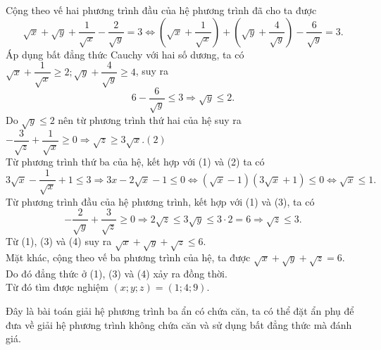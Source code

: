 \begin{bt}
{		 Cộng theo vế hai phương trình đầu của hệ phương trình đã cho ta được
		\[\sqrt{x}+\sqrt{y}+\dfrac{1}{\sqrt{x}}-\dfrac{2}{\sqrt{y}}=3 \Leftrightarrow \left(\sqrt{x}+\dfrac{1}{\sqrt{x}}\right)+\left(\sqrt{y}+\dfrac{4}{\sqrt{y}}\right)-\dfrac{6}{\sqrt{y}}=3.\]
		Áp dụng bất đẳng thức Cauchy với hai số dương, ta có $\sqrt{x}+\dfrac{1}{\sqrt{x}}\ge 2;\sqrt{y}+\dfrac{4}{\sqrt{y}}\ge 4$,  suy ra \[6-\dfrac{6}{\sqrt{y}}\le 3 \Rightarrow \sqrt{y}\le 2.\tag{1}\]
		Do $\sqrt{y}\le 2$ nên từ phương trình thứ hai của hệ suy ra $-\dfrac{3}{\sqrt{z}}+\dfrac{1}{\sqrt{x}}\ge 0\Rightarrow \sqrt{z}\ge 3\sqrt{x}$.\hfill$(2)$\\
		Từ phương trình thứ ba của hệ, kết hợp với (1) và (2) ta có
		\[3\sqrt{x}-\dfrac{1}{\sqrt{x}}+1\le 3\Rightarrow 3x-2\sqrt{x}-1\le 0 \Leftrightarrow \left(\sqrt{x}-1\right)\left(3\sqrt{x}+1\right)\le 0\Leftrightarrow\sqrt{x}\le 1.\tag{3}\]
		Từ phương trình đầu của hệ phương trình, kết hợp với (1) và (3), ta có
		\[-\dfrac{2}{\sqrt{y}}+\dfrac{3}{\sqrt{z}}\ge 0\Rightarrow 2\sqrt{z}\le 3\sqrt{y}\le 3\cdot 2=6\Rightarrow \sqrt{z}\le 3.\tag{4}\]
		Từ (1), (3) và (4) suy ra $\sqrt{x}+\sqrt{y}+\sqrt{z}\le 6$.\\
		Mặt khác, cộng theo vế ba phương trình của hệ, ta được $\sqrt{x}+\sqrt{y}+\sqrt{z}=6$.\\
		Do đó đẳng thức ở (1), (3) và (4) xảy ra đồng thời.\\
		Từ đó tìm được nghiệm $\left(x;y;z\right)=\left(1;4;9\right)$.
		\begin{nx}
			Đây là bài toán giải hệ phương trình ba ẩn có chứa căn, ta có thể đặt ẩn phụ để đưa về giải hệ phương trình không chứa căn và sử dụng bất đẳng thức mà đánh giá.
		\end{nx}
	}
\end{bt}


